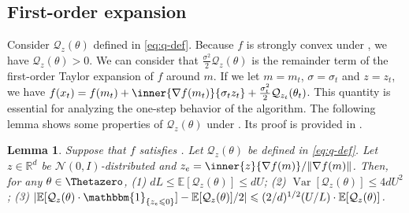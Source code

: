 \documentclass[journal]{IEEEtran}
\DeclareMathOperator{\Tr}{Tr}     %
\DeclareMathOperator{\Var}{Var}   %
\providecommand{\R}{\mathbb{R}} %
\providecommand{\E}{\mathbb{E}} %
\providecommand{\ind}[1]{\ensuremath{\mathbbm{1}_{\left\{#1\right\}}}} %
\renewcommand{\leq}{\leqslant} %
\DeclarePairedDelimiter{\norm}{\lVert}{\rVert}
\DeclarePairedDelimiter{\abs}{\lvert}{\rvert}
\newtheorem{lemma}[theorem]{Lemma}
\theoremstyle{definition}
\newcommand{\yohe}[1]{{\color{cyan}Y.A.: #1}}
\newcommand{\mori}[1]{{\color[rgb]{0.22, 0.71, 0.55} MORINAGA :  #1}}
\begin{document}
\subsection{First-order expansion}\label{subsec:First-order expansion}
Consider $\mathcal{Q}_z(\theta)$ defined in \eqref{eq:q-def}. 
Because $f$ is strongly convex under , we have $\mathcal{Q}_z(\theta) > 0$. We can consider that $\frac{\sigma^2}{2} \mathcal{Q}_z(\theta)$ is the remainder term of the first-order Taylor expansion of $f$ around $m$. 
If we let $m = m_t$, $\sigma = \sigma_t$ and $z = z_t$, we have $f(x_t) = f(m_t) + \inner{\nabla f(m_t)}{ \sigma_t z_t} + \frac{\sigma_t^2}{2} \mathcal{Q}_{z_t}(\theta_t)$.
This quantity is essential for analyzing the one-step behavior of the algorithm.
The following lemma shows some properties of $\mathcal{Q}_z(\theta)$ under .
Its proof is provided in .
\begin{lemma}\label{lemma:variance}
Suppose that $f$ satisfies . 
Let $\mathcal{Q}_z(\theta)$ be defined in \eqref{eq:q-def}. 
Let $z \in \R^d$ be $\mathcal{N}(0, I)$-distributed and $z_e = \inner{z}{\nabla f(m)}/\norm{\nabla f(m)}$. 
Then, for any $\theta\in\Thetazero$,
(1) $d L \leq \E[\mathcal{Q}_z(\theta)] \leq d U$;
(2) $\Var[\mathcal{Q}_z(\theta)] \leq 4 d U^2$;
(3) $\abs{ \E[\mathcal{Q}_z(\theta) \cdot \ind{z_e \leq 0}] - \E[\mathcal{Q}_z(\theta)] / 2 } \leq (2 / d)^{1/2} (U/L) \cdot \E[\mathcal{Q}_z(\theta)]$.
\end{lemma}
\end{document}
